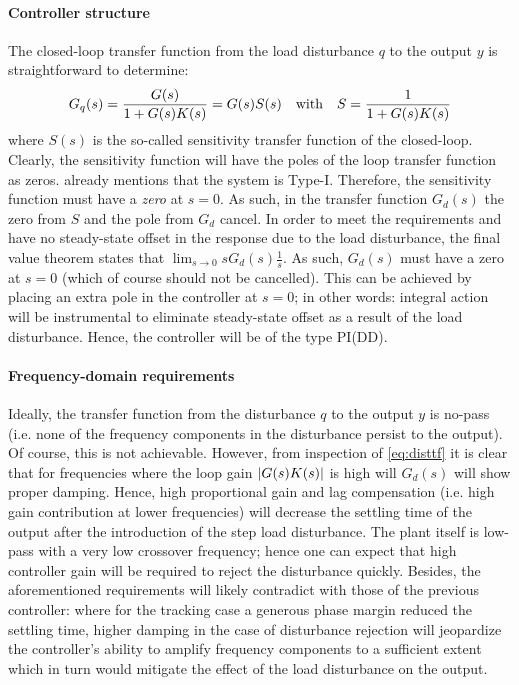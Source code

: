 \paragraph{Controller structure}
The closed-loop transfer function from the load disturbance $q$ to the output $y$ is straightforward to determine:
\begin{equation}
    G_q(s) = \frac{G(s)}{1 + G(s)K(s)} = G(s)S(s)\qq{with}S = \frac{1}{1 + G(s)K(s)}
    \label{eq:disttf}
\end{equation}
where $S(s)$ is the so-called sensitivity transfer function of the closed-loop. Clearly, the sensitivity function will have the poles of the loop transfer function as zeros.  already mentions that the system is Type-I. Therefore, the sensitivity function must have a \textit{zero} at $s = 0$. As such, in the transfer function $G_d(s)$ the zero from $S$ and the pole from $G_d$ cancel. In order to meet the requirements and have no steady-state offset in the response due to the load disturbance, the final value theorem states that $\lim_{s\to 0} sG_d(s)\frac{1}{s}$. As such, $G_d(s)$ must have a zero at $s = 0$ (which of course should not be cancelled). This can be achieved by placing an extra pole in the controller at $s = 0$; in other words: integral action will be instrumental to eliminate steady-state offset as a result of the load disturbance. Hence, the controller will be of the type PI(DD).

\paragraph{Frequency-domain requirements}
Ideally, the transfer function from the disturbance $q$ to the output $y$ is no-pass (i.e. none of the frequency components in the disturbance persist to the output). Of course, this is not achievable. However, from inspection of \cref{eq:disttf} it is clear that for frequencies where the loop gain $\abs{G(s)K(s)}$ is high will $G_d(s)$ will show proper damping. Hence, high proportional gain and lag compensation (i.e. high gain contribution at lower frequencies) will decrease the settling time of the output after the introduction of the step load disturbance. The plant itself is low-pass with a very low crossover frequency; hence one can expect that high controller gain will be required to reject the disturbance quickly. Besides, the aforementioned requirements will likely contradict with those of the previous controller: where for the tracking case a generous phase margin reduced the settling time, higher damping in the case of disturbance rejection will jeopardize the controller's ability to amplify frequency components to a sufficient extent which in turn would mitigate the effect of the load disturbance on the output.

